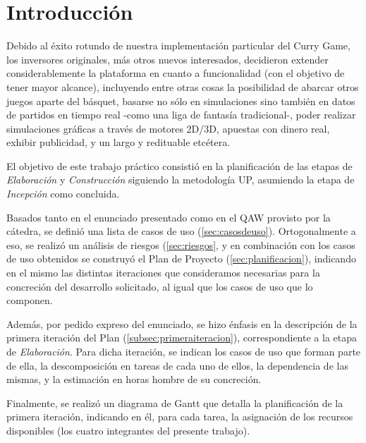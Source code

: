 \section{Introducción}
Debido al éxito rotundo de nuestra implementación particular del Curry Game, los inversores originales, más otros nuevos interesados, decidieron extender considerablemente la plataforma en cuanto a funcionalidad (con el objetivo de tener mayor alcance), incluyendo entre otras cosas la posibilidad de abarcar otros juegos aparte del básquet, basarse no sólo en simulaciones sino también en datos de partidos en tiempo real -como una liga de fantasía tradicional-, poder realizar simulaciones gráficas a través de motores 2D/3D, apuestas con dinero real, exhibir publicidad, y un largo y redituable etcétera.

El objetivo de este trabajo práctico consistió en la planificación de las etapas de \emph{Elaboración} y \emph{Construcción} siguiendo la metodología UP, asumiendo la etapa de \emph{Incepción} como concluida. 

Basados tanto en el enunciado presentado como en el QAW provisto por la cátedra, se definió una lista de casos de uso (\ref{sec:casosdeuso}). Ortogonalmente a eso, se realizó un análisis de riesgos (\ref{sec:riesgos}, y en combinación con los casos de uso  obtenidos se construyó el Plan de Proyecto (\ref{sec:planificacion}), indicando en el mismo las distintas iteraciones que consideramos necesarias para la concreción del desarrollo solicitado, al igual que los casos de uso que lo componen.

Además, por pedido expreso del enunciado, se hizo énfasis en la descripción de la primera iteración del Plan (\ref{subsec:primeraiteracion}), correspondiente a la etapa de \emph{Elaboración}. Para dicha iteración, se indican los casos de uso que forman parte de ella, la descomposición en tareas de cada uno de ellos, la dependencia de las mismas, y la estimación en horas hombre de su concreción.

Finalmente, se realizó un diagrama de Gantt que detalla la planificación de la primera iteración, indicando en él, para cada tarea, la asignación de los recursos disponibles (los cuatro integrantes del presente trabajo).
